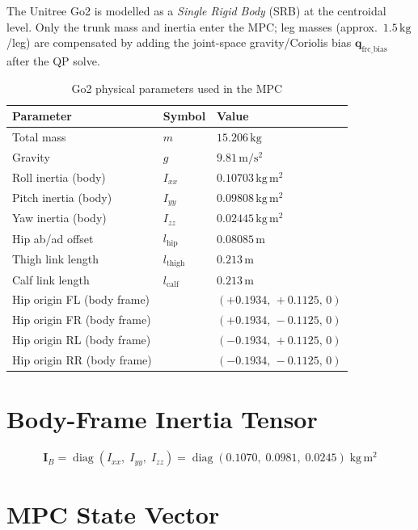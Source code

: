 \documentclass[12pt,a4paper]{report}
\newcommand{\vect}[1]{\bm{#1}}
\newcommand{\mat}[1]{\mathbf{#1}}
\DeclareMathOperator{\diag}{diag}
\begin{document}
The Unitree Go2 is modelled as a \emph{Single Rigid Body} (SRB) at the
centroidal level.  Only the trunk mass and inertia enter the MPC; leg masses
(approx.\ $1.5\,\mathrm{kg}$/leg) are compensated by adding the joint-space
gravity/Coriolis bias $\vect{q}_{\text{frc\_bias}}$ after the QP solve.

\begin{table}[H]
\centering
\caption{Go2 physical parameters used in the MPC}
\begin{tabular}{lll}
\toprule
\textbf{Parameter} & \textbf{Symbol} & \textbf{Value} \\
\midrule
Total mass            & $m$      & $15.206\,\mathrm{kg}$ \\
Gravity               & $g$      & $9.81\,\mathrm{m/s^2}$ \\
Roll inertia (body)   & $I_{xx}$ & $0.10703\,\mathrm{kg\,m^2}$ \\
Pitch inertia (body)  & $I_{yy}$ & $0.09808\,\mathrm{kg\,m^2}$ \\
Yaw inertia (body)    & $I_{zz}$ & $0.02445\,\mathrm{kg\,m^2}$ \\
Hip ab/ad offset      & $l_\mathrm{hip}$   & $0.08085\,\mathrm{m}$ \\
Thigh link length     & $l_\mathrm{thigh}$ & $0.213\,\mathrm{m}$ \\
Calf link length      & $l_\mathrm{calf}$  & $0.213\,\mathrm{m}$ \\
\midrule
Hip origin FL (body frame) & & $(+0.1934,\,+0.1125,\,0)$ \\
Hip origin FR (body frame) & & $(+0.1934,\,-0.1125,\,0)$ \\
Hip origin RL (body frame) & & $(-0.1934,\,+0.1125,\,0)$ \\
Hip origin RR (body frame) & & $(-0.1934,\,-0.1125,\,0)$ \\
\bottomrule
\end{tabular}
\end{table}

\section{Body-Frame Inertia Tensor}

\begin{equation}
    \mat{I}_B = \diag\!\left(I_{xx},\; I_{yy},\; I_{zz}\right)
              = \diag(0.1070,\; 0.0981,\; 0.0245)\;\mathrm{kg\,m^2}
\end{equation}

\section{MPC State Vector}
\end{document}
